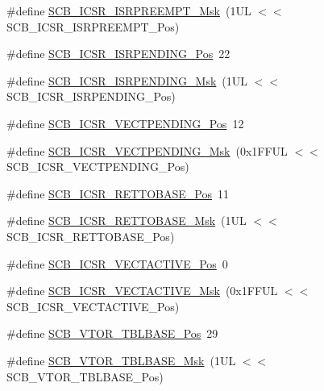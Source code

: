 \begin{DoxyCompactItemize}
\#define \hyperlink{group__CMSIS__SCB_gaa966600396290808d596fe96e92ca2b5}{S\-C\-B\-\_\-\-I\-C\-S\-R\-\_\-\-I\-S\-R\-P\-R\-E\-E\-M\-P\-T\-\_\-\-Msk}~(1\-U\-L $<$$<$ S\-C\-B\-\_\-\-I\-C\-S\-R\-\_\-\-I\-S\-R\-P\-R\-E\-E\-M\-P\-T\-\_\-\-Pos)
\item 
\#define \hyperlink{group__CMSIS__SCB_ga10749d92b9b744094b845c2eb46d4319}{S\-C\-B\-\_\-\-I\-C\-S\-R\-\_\-\-I\-S\-R\-P\-E\-N\-D\-I\-N\-G\-\_\-\-Pos}~22
\item 
\#define \hyperlink{group__CMSIS__SCB_ga056d74fd538e5d36d3be1f28d399c877}{S\-C\-B\-\_\-\-I\-C\-S\-R\-\_\-\-I\-S\-R\-P\-E\-N\-D\-I\-N\-G\-\_\-\-Msk}~(1\-U\-L $<$$<$ S\-C\-B\-\_\-\-I\-C\-S\-R\-\_\-\-I\-S\-R\-P\-E\-N\-D\-I\-N\-G\-\_\-\-Pos)
\item 
\#define \hyperlink{group__CMSIS__SCB_gada60c92bf88d6fd21a8f49efa4a127b8}{S\-C\-B\-\_\-\-I\-C\-S\-R\-\_\-\-V\-E\-C\-T\-P\-E\-N\-D\-I\-N\-G\-\_\-\-Pos}~12
\item 
\#define \hyperlink{group__CMSIS__SCB_gacb6992e7c7ddc27a370f62878a21ef72}{S\-C\-B\-\_\-\-I\-C\-S\-R\-\_\-\-V\-E\-C\-T\-P\-E\-N\-D\-I\-N\-G\-\_\-\-Msk}~(0x1\-F\-F\-U\-L $<$$<$ S\-C\-B\-\_\-\-I\-C\-S\-R\-\_\-\-V\-E\-C\-T\-P\-E\-N\-D\-I\-N\-G\-\_\-\-Pos)
\item 
\#define \hyperlink{group__CMSIS__SCB_ga403d154200242629e6d2764bfc12a7ec}{S\-C\-B\-\_\-\-I\-C\-S\-R\-\_\-\-R\-E\-T\-T\-O\-B\-A\-S\-E\-\_\-\-Pos}~11
\item 
\#define \hyperlink{group__CMSIS__SCB_gaca6fc3f79bb550f64fd7df782ed4a5f6}{S\-C\-B\-\_\-\-I\-C\-S\-R\-\_\-\-R\-E\-T\-T\-O\-B\-A\-S\-E\-\_\-\-Msk}~(1\-U\-L $<$$<$ S\-C\-B\-\_\-\-I\-C\-S\-R\-\_\-\-R\-E\-T\-T\-O\-B\-A\-S\-E\-\_\-\-Pos)
\item 
\#define \hyperlink{group__CMSIS__SCB_gae4f602c7c5c895d5fb687b71b0979fc3}{S\-C\-B\-\_\-\-I\-C\-S\-R\-\_\-\-V\-E\-C\-T\-A\-C\-T\-I\-V\-E\-\_\-\-Pos}~0
\item 
\#define \hyperlink{group__CMSIS__SCB_ga5533791a4ecf1b9301c883047b3e8396}{S\-C\-B\-\_\-\-I\-C\-S\-R\-\_\-\-V\-E\-C\-T\-A\-C\-T\-I\-V\-E\-\_\-\-Msk}~(0x1\-F\-F\-U\-L $<$$<$ S\-C\-B\-\_\-\-I\-C\-S\-R\-\_\-\-V\-E\-C\-T\-A\-C\-T\-I\-V\-E\-\_\-\-Pos)
\item 
\#define \hyperlink{group__CMSIS__SCB_gad9720a44320c053883d03b883b955751}{S\-C\-B\-\_\-\-V\-T\-O\-R\-\_\-\-T\-B\-L\-B\-A\-S\-E\-\_\-\-Pos}~29
\item 
\#define \hyperlink{group__CMSIS__SCB_ga778dd0ba178466b2a8877a6b8aa345ee}{S\-C\-B\-\_\-\-V\-T\-O\-R\-\_\-\-T\-B\-L\-B\-A\-S\-E\-\_\-\-Msk}~(1\-U\-L $<$$<$ S\-C\-B\-\_\-\-V\-T\-O\-R\-\_\-\-T\-B\-L\-B\-A\-S\-E\-\_\-\-Pos)

\end{DoxyCompactItemize}
